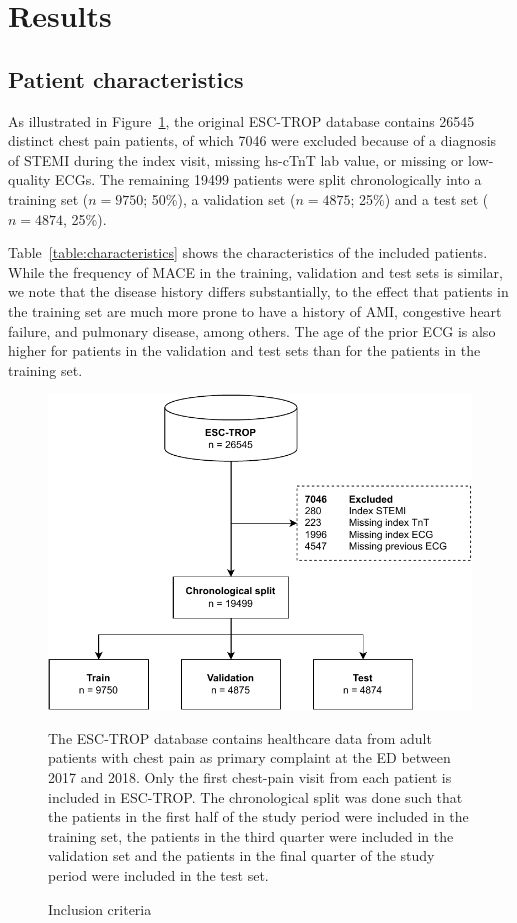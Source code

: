\documentclass[preprint]{elsarticle}
\begin{document}
\section{Results}
\subsection{Patient characteristics}
\label{sec:patient_characteristics}
As illustrated in Figure~\ref{fig:inclusion}, the original ESC-TROP database contains 26545 distinct chest pain patients, of which 7046 were excluded because of a diagnosis of STEMI during the index visit, missing hs-cTnT lab value, or missing or low-quality ECGs. The remaining 19499 patients were split chronologically into a training set ($n=9750$; 50\%), a validation set ($n=4875$; 25\%) and a test set ($n=4874$, 25\%).

Table~\ref{table:characteristics} shows the characteristics of the included patients. While the frequency of MACE in the training, validation and test sets is similar, we note that the disease history differs substantially, to the effect that patients in the training set are much more prone to have a history of AMI, congestive heart failure, and pulmonary disease, among others. The age of the prior ECG is also higher for patients in the validation and test sets than for the patients in the training set.

\begin{figure}[h!]
\includegraphics[width=\linewidth]{figures/inclusioncriteria.pdf}
\centering
\caption{Inclusion criteria}
\medskip
\small
The ESC-TROP database contains healthcare data from adult patients with chest pain as primary complaint at the ED between 2017 and 2018. Only the first chest-pain visit from each patient is included in ESC-TROP. The chronological split was done such that the patients in the first half of the study period were included in the training set, the patients in the third quarter were included in the validation set and the patients in the final quarter of the study period were included in the test set. 
\label{fig:inclusion}
\end{figure}
\end{document}
